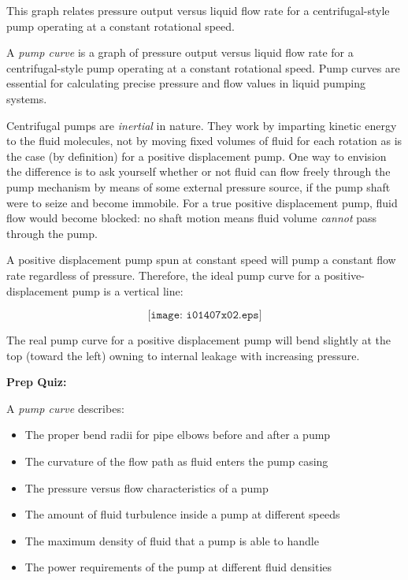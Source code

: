 This graph relates pressure output versus liquid flow rate for a centrifugal-style pump operating at a constant rotational speed.
 






A {\it pump curve} is a graph of pressure output versus liquid flow rate for a centrifugal-style pump operating at a constant rotational speed.  Pump curves are essential for calculating precise pressure and flow values in liquid pumping systems.

\vskip 10pt

Centrifugal pumps are {\it inertial} in nature.  They work by imparting kinetic energy to the fluid molecules, not by moving fixed volumes of fluid for each rotation as is the case (by definition) for a positive displacement pump.  One way to envision the difference is to ask yourself whether or not fluid can flow freely through the pump mechanism by means of some external pressure source, if the pump shaft were to seize and become immobile.  For a true positive displacement pump, fluid flow would become blocked: no shaft motion means fluid volume {\it cannot} pass through the pump.

\vskip 10pt

A positive displacement pump spun at constant speed will pump a constant flow rate regardless of pressure.  Therefore, the ideal pump curve for a positive-displacement pump is a vertical line:

$$\texttt{[image: i01407x02.eps]}$$

The real pump curve for a positive displacement pump will bend slightly at the top (toward the left) owning to internal leakage with increasing pressure.

\vfil \eject

\noindent
{\bf Prep Quiz:}

A {\it pump curve} describes:

\begin{itemize}
\item{} The proper bend radii for pipe elbows before and after a pump
\vskip 5pt 
\item{} The curvature of the flow path as fluid enters the pump casing
\vskip 5pt 
\item{} The pressure versus flow characteristics of a pump
\vskip 5pt 
\item{} The amount of fluid turbulence inside a pump at different speeds
\vskip 5pt 
\item{} The maximum density of fluid that a pump is able to handle
\vskip 5pt 
\item{} The power requirements of the pump at different fluid densities
\end{itemize}





